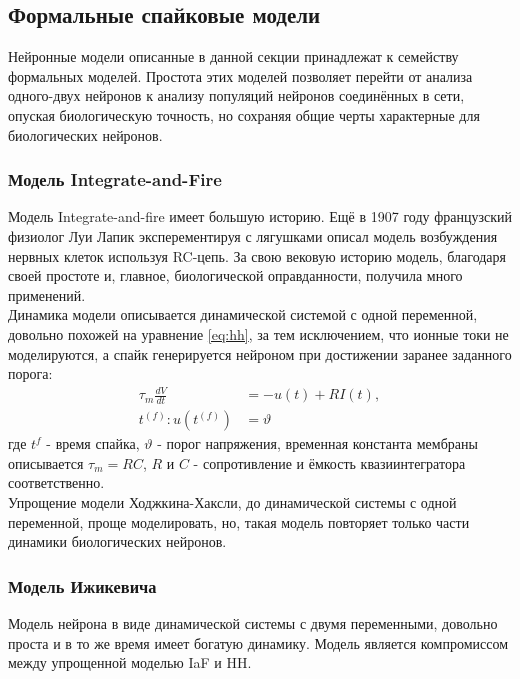 \documentclass[a4paper,10pt]{article}
\begin{document}
\subsection{Формальные спайковые модели}   
\indent Нейронные модели описанные в данной секции принадлежат к семейству формальных моделей. Простота этих моделей позволяет перейти от анализа одного-двух нейронов к анализу популяций нейронов соединённых в сети, опуская биологическую точность, но сохраняя общие черты характерные для биологических нейронов.\\
\subsubsection{Модель Integrate-and-Fire}

\indent Модель Integrate-and-fire имеет большую историю. Ещё в 1907 году 	французский физиолог Луи Лапик эксперементируя с лягушками описал модель возбуждения нервных клеток используя RC-цепь. За свою вековую историю модель, благодаря своей простоте и, главное, биологической оправданности, получила много применений.\\
   \indent Динамика модели описывается динамической системой с одной переменной, довольно похожей на уравнение \ref{eq:hh}, за тем исключением, что ионные токи не моделируются, а спайк генерируется нейроном при достижении заранее заданного порога:\\
   \begin{equation}\label{eq:iaf}
   \begin{split}
   \tau_{m}\frac{dV}{dt}&=-u(t)+R I(t),\\
   t^{(f)}: u(t^{(f)}) &= \vartheta 
   \end{split}
   \end{equation}
где $t^{f}$ - время спайка, $\vartheta$ - порог напряжения, временная константа мембраны описывается $\tau_{m}=RC$, $R$ и $C$ - сопротивление и ёмкость квазиинтегратора соответственно.\\   
\indent Упрощение модели Ходжкина-Хаксли, до динамической системы с одной переменной, проще моделировать, но, такая модель повторяет только части динамики биологических нейронов.

\subsubsection{Модель Ижикевича}
Модель нейрона в виде динамической системы с двумя переменными, довольно проста и в то же время имеет богатую динамику. Модель является компромиссом между упрощенной моделью IaF и HH. 
\end{document}
